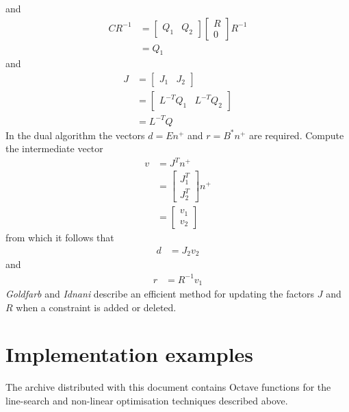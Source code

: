 \documentclass[a4paper,twoside,10pt,english]{report}
\begin{document}
and
\begin{align*}
CR^{-1} &= \left[\begin{array}{cc}
Q_{1} & Q_{2}\end{array}\right]\left[\begin{array}{c}
R\\
0
\end{array}\right]R^{-1}\\
 &= Q_{1}
\end{align*}
and
\begin{align*}
J &= \left[\begin{array}{cc}
J_{1} & J_{2}\end{array}\right]\\
 &= \left[\begin{array}{cc}
L^{-T}Q_{1} & L^{-T}Q_{2}\end{array}\right]\\
 &= L^{-T}Q
\end{align*}
In the dual algorithm the vectors $d=En^{+}$ and $r=B^{*}n^{+}$
are required. Compute the intermediate vector 
\begin{align*}
v &= J^{T}n^{+}\\
 &= \left[\begin{array}{c}
J_{1}^{T}\\
J_{2}^{T}
\end{array}\right]n^{+}\\
 &= \left[\begin{array}{c}
v_{1}\\
v_{2}
\end{array}\right]
\end{align*}
from which it follows that 
\begin{align*}
d &= J_{2}v_{2}
\end{align*}
and 
\begin{align*}
r &= R^{-1}v_{1}
\end{align*}
\emph{Goldfarb} and \emph{Idnani} describe an efficient method for updating the
factors $J$ and $R$ when a constraint is added or deleted. 
\section{Implementation examples}
The archive distributed with this document contains Octave functions for the
line-search and non-linear optimisation techniques described above. 
\end{document}
